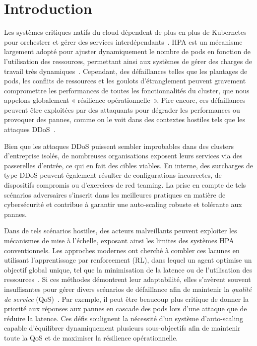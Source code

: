 
\section{Introduction}
\label{sec:introduction}

Les systèmes critiques natifs du cloud dépendent de plus en plus de Kubernetes pour orchestrer et gérer des services interdépendants~\cite{Pahl2019}. HPA est un mécanisme largement adopté pour ajuster dynamiquement le nombre de pods en fonction de l'utilisation des ressources, permettant ainsi aux systèmes de gérer des charges de travail très dynamiques~\cite{Toka2020}. Cependant, des défaillances telles que les plantages de pods, les conflits de ressources et les goulots d'étranglement peuvent gravement compromettre les performances de toutes les fonctionnalités du cluster, que nous appelons globalement « résilience opérationnelle~\cite{burns2016borg}». Pire encore, ces défaillances peuvent être exploitées par des attaquants pour dégrader les performances ou provoquer des pannes, comme on le voit dans des contextes hostiles tels que les attaques DDoS~\cite{David2021}.

Bien que les attaques DDoS puissent sembler improbables dans des clusters d'entreprise isolés, de nombreuses organisations exposent leurs services via des passerelles d'entrée, ce qui en fait des cibles viables. En interne, des surcharges de type DDoS peuvent également résulter de configurations incorrectes, de dispositifs compromis ou d'exercices de red teaming. La prise en compte de tels scénarios adversaires s'inscrit dans les meilleures pratiques en matière de cybersécurité et contribue à garantir une auto-scaling robuste et tolérante aux pannes.

Dans de tels scénarios hostiles, des acteurs malveillants peuvent exploiter les mécanismes de mise à l'échelle, exposant ainsi les limites des systèmes HPA conventionnels. Les approches modernes ont cherché à combler ces lacunes en utilisant l'apprentissage par renforcement (RL), dans lequel un agent optimise un objectif global unique, tel que la minimisation de la latence ou de l'utilisation des ressources~\cite{Gari2021}. Si ces méthodes démontrent leur adaptabilité, elles s'avèrent souvent insuffisantes pour gérer divers scénarios de défaillance afin de maintenir la \textit{qualité de service} (QoS)~\cite{Liu2024}. Par exemple, il peut être beaucoup plus critique de donner la priorité aux réponses aux pannes en cascade des pods lors d'une attaque que de réduire la latence. Ces défis soulignent la nécessité d'un système d'auto-scaling capable d'équilibrer dynamiquement plusieurs sous-objectifs afin de maintenir toute la QoS et de maximiser la résilience opérationnelle.

